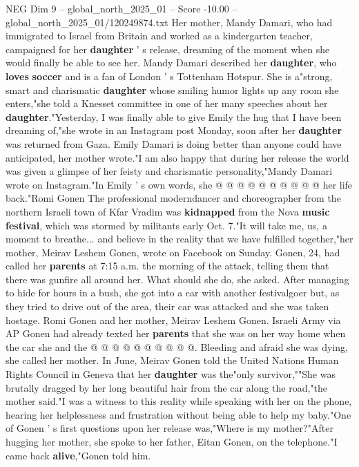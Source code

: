\begin{textsample}{NEG Dim 9 – global\_north\_2025\_01 – Score -10.00 – global\_north\_2025\_01/120249874.txt}  \label{ex:f9_neg_022}
Her mother, Mandy Damari, who had immigrated to Israel from Britain and worked as a kindergarten teacher, campaigned for her \textbf{daughter} ' s release, dreaming of the moment when she would finally be able to see her.
Mandy Damari described her \textbf{daughter}, who \textbf{loves} \textbf{soccer} and is a fan of London ' s Tottenham Hotspur.
She is a"strong, smart and charismatic \textbf{daughter} whose smiling humor lights up any room she enters,"she told a Knesset committee in one of her many speeches about her \textbf{daughter}."Yesterday, I was finally able to give Emily the hug that I have been dreaming of,"she wrote in an Instagram post Monday, soon after her \textbf{daughter} was returned from Gaza.
Emily Damari is doing better than anyone could have anticipated, her mother wrote."I am also happy that during her release the world was given a glimpse of her feisty and charismatic personality,"Mandy Damari wrote on Instagram."In Emily ' s own words, she @ @ @ @ @ @ @ @ @ @ her life back."Romi Gonen The professional moderndancer and choreographer from the northern Israeli town of Kfar Vradim was \textbf{kidnapped} from the Nova \textbf{music} \textbf{festival}, which was stormed by militants early Oct. 7."It will take me, us, a moment to breathe... and believe in the reality that we have fulfilled together,"her mother, Meirav Leshem Gonen, wrote on Facebook on Sunday.
Gonen, 24, had called her \textbf{parents} at 7:15 a.m. the morning of the attack, telling them that there was gunfire all around her.
What should she do, she asked.
After managing to hide for hours in a bush, she got into a car with another festivalgoer but, as they tried to drive out of the area, their car was attacked and she was taken hostage.
Romi Gonen and her mother, Meirav Leshem Gonen.
Israeli Army via AP Gonen had already texted her \textbf{parents} that she was on her way home when the car she and the @ @ @ @ @ @ @ @ @ @.
Bleeding and afraid she was dying, she called her mother.
In June, Meirav Gonen told the United Nations Human Rights Council in Geneva that her \textbf{daughter} was the"only survivor,""She was brutally dragged by her long beautiful hair from the car along the road,"the mother said."I was a witness to this reality while speaking with her on the phone, hearing her helplessness and frustration without being able to help my baby."One of Gonen ' s first questions upon her release was,"Where is my mother?"After hugging her mother, she spoke to her father, Eitan Gonen, on the telephone."I came back \textbf{alive},"Gonen told him.

\end{textsample}
